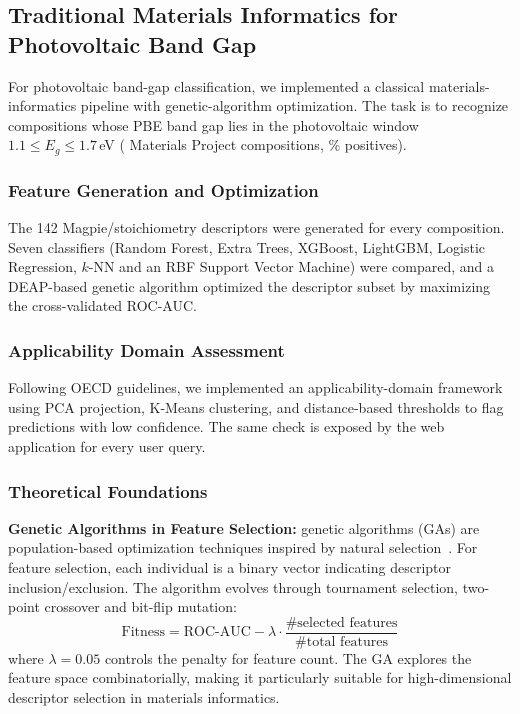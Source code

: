 \subsection{Traditional Materials Informatics for Photovoltaic Band Gap}

For photovoltaic band-gap classification, we implemented a classical materials-informatics
pipeline with genetic-algorithm optimization. The task is to recognize compositions whose PBE
band gap lies in the photovoltaic window $1.1 \le E_g \le 1.7$\,eV (\GapN{} Materials Project
compositions, \GapPos{}\% positives).

\subsubsection{Feature Generation and Optimization}
The 142 Magpie/stoichiometry descriptors were generated for every composition. Seven
classifiers (Random Forest, Extra Trees, XGBoost, LightGBM, Logistic Regression, $k$-NN and an
RBF Support Vector Machine) were compared, and a DEAP-based genetic algorithm optimized the
descriptor subset by maximizing the cross-validated ROC-AUC.

\subsubsection{Applicability Domain Assessment}
Following OECD guidelines, we implemented an applicability-domain framework using PCA
projection, K-Means clustering, and distance-based thresholds to flag predictions with low
confidence. The same check is exposed by the web application for every user query.

\subsubsection{Theoretical Foundations}

\textbf{Genetic Algorithms in Feature Selection:} genetic algorithms (GAs) are
population-based optimization techniques inspired by natural selection~\cite{deap}. For feature
selection, each individual is a binary vector indicating descriptor inclusion/exclusion. The
algorithm evolves through tournament selection, two-point crossover and bit-flip mutation:
\[
\text{Fitness} = \text{ROC-AUC} - \lambda \cdot \frac{\#\text{selected features}}{\#\text{total features}}
\]
where $\lambda = 0.05$ controls the penalty for feature count. The GA explores the feature
space combinatorially, making it particularly suitable for high-dimensional descriptor
selection in materials informatics.

